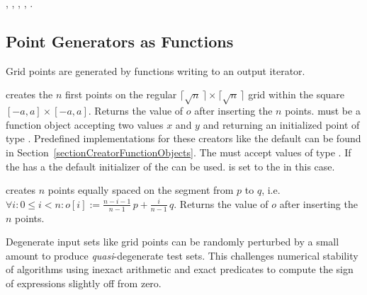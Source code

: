 \ccSeeAlso

, , 
, ,
\ccTexHtml{\\}{}
.


\subsection{Point Generators as Functions}


Grid points are generated by functions writing to an output iterator.

\def\ccLongParamLayout{\ccTrue}
{ creates the $n$ first points on the regular $\lceil\sqrt{n}\,\rceil
    \times \lceil  \sqrt{n}\,\rceil$ grid within the square
    $[-a,a]\times [-a,a]$. Returns the value of $o$ after inserting
    the $n$ points. 
    \ccPrecond {} must be a function object accepting two
     values $x$ and $y$ and returning an initialized point
     of type . Predefined implementations for these
    creators like the default can be found in
    Section~\ref{sectionCreatorFunctionObjects}. The
     must accept values of type . If the
     has a  the default
    initializer of the  can be used.  is set to
    the  in this case.}
\def\ccLongParamLayout{\ccFalse}


{ creates $n$ points equally spaced on the segment from $p$ to $q$,
    i.e.~$\forall i: 0 \le i < n: o[i] := \frac{n-i-1}{n-1}\, p +
    \frac{i}{n-1}\, q$. Returns the value of $o$ after inserting
    the $n$ points.}


Degenerate input sets like grid points can be randomly perturbed by a
small amount to produce {\em quasi}-degenerate test sets. This
challenges numerical stability of algorithms using inexact arithmetic and
exact predicates to compute the sign of expressions slightly off from zero.

